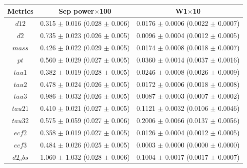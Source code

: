 \begin{ruledtabular}
  \begin{tabular}{ccc}
  \textbf{Metrics} & \textbf{Sep power}$\times$100 & \textbf{W1}$\times$10 \\
  \hline
  \textbf{$d12$} & 0.315 $\pm$ 0.016 (0.028 $\pm$ 0.006) & 0.0176 $\pm$ 0.0006 (0.0022 $\pm$ 0.0007) \\
  \textbf{$d2$} & 0.735 $\pm$ 0.023 (0.026 $\pm$ 0.005) & 0.0096 $\pm$ 0.0004 (0.0012 $\pm$ 0.0005) \\
  \textbf{$mass$} & 0.426 $\pm$ 0.022 (0.029 $\pm$ 0.005) & 0.0174 $\pm$ 0.0008 (0.0018 $\pm$ 0.0007) \\
  \textbf{$pt$} & 0.560 $\pm$ 0.029 (0.027 $\pm$ 0.005) & 0.0360 $\pm$ 0.0014 (0.0037 $\pm$ 0.0016) \\
  \textbf{$tau1$} & 0.382 $\pm$ 0.019 (0.028 $\pm$ 0.005) & 0.0246 $\pm$ 0.0008 (0.0026 $\pm$ 0.0009) \\
  \textbf{$tau2$} & 0.478 $\pm$ 0.024 (0.026 $\pm$ 0.005) & 0.0172 $\pm$ 0.0006 (0.0018 $\pm$ 0.0008) \\
  \textbf{$tau3$} & 0.986 $\pm$ 0.032 (0.026 $\pm$ 0.005) & 0.0087 $\pm$ 0.0003 (0.0007 $\pm$ 0.0002) \\
  \textbf{$tau21$} & 0.410 $\pm$ 0.021 (0.027 $\pm$ 0.005) & 0.1121 $\pm$ 0.0032 (0.0106 $\pm$ 0.0046) \\
  \textbf{$tau32$} & 0.575 $\pm$ 0.059 (0.027 $\pm$ 0.006) & 0.2006 $\pm$ 0.0066 (0.0137 $\pm$ 0.0056) \\
  \textbf{$ecf2$} & 0.358 $\pm$ 0.019 (0.027 $\pm$ 0.005) & 0.0126 $\pm$ 0.0004 (0.0012 $\pm$ 0.0005) \\
  \textbf{$ecf3$} & 0.484 $\pm$ 0.026 (0.025 $\pm$ 0.005) & 0.0003 $\pm$ 0.0000 (0.0000 $\pm$ 0.0000) \\
  \textbf{$d2_obs$} & 1.060 $\pm$ 1.032 (0.028 $\pm$ 0.006) & 0.1004 $\pm$ 0.0017 (0.0017 $\pm$ 0.0007) \\
  \end{tabular}
\end{ruledtabular}